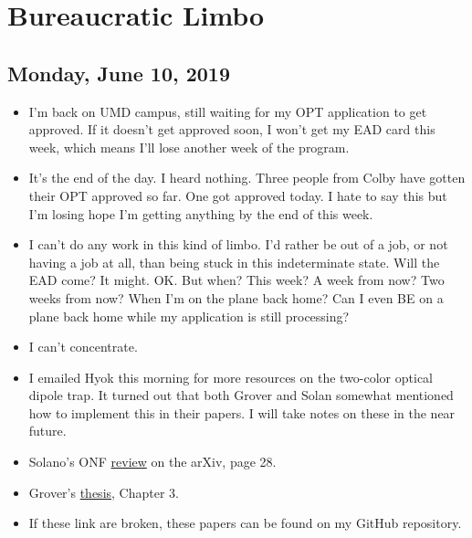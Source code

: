 \documentclass{report}
\theoremstyle{definition}
\begin{document}
\chapter{Bureaucratic Limbo}

\section{Monday, June 10, 2019}

\begin{itemize}
	\item I'm back on UMD campus, still waiting for my OPT application to get approved. If it doesn't get approved soon, I won't get my EAD card this week, which means I'll lose another week of the program.
	
	
	\item It's the end of the day. I heard nothing. Three people from Colby have gotten their OPT approved so far. One got approved today. I hate to say this but I'm losing hope I'm getting anything by the end of this week. 
	
	
	\item I can't do any work in this kind of limbo. I'd rather be out of a job, or not having a job at all, than being stuck in this indeterminate state. Will the EAD come? It might. OK. But when? This week? A week from now? Two weeks from now? When I'm on the plane back home? Can I even BE on a plane back home while my application is still processing?
	
	\item I can't concentrate. 
	
	\item I emailed Hyok this morning for more resources on the two-color optical dipole trap. It turned out that both Grover and Solan somewhat mentioned how to implement this in their papers. I will take notes on these in the near future. 
	
	\item Solano's ONF \href{https://arxiv.org/pdf/1703.10533.pdf}{review} on the arXiv, page 28. 
	
	\item Grover's \href{https://drum.lib.umd.edu/handle/1903/16638}{thesis}, Chapter 3. 
	
	\item If these link are broken, these papers can be found on my GitHub repository. 

\end{itemize}
\end{document}

